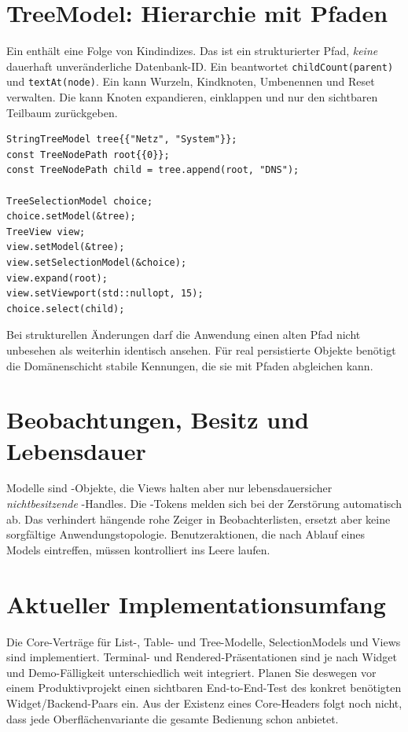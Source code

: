 \section{TreeModel: Hierarchie mit Pfaden}
Ein  enthält eine Folge
von Kindindizes. Das ist ein strukturierter
Pfad, \emph{keine} dauerhaft unveränderliche
Datenbank-ID. Ein  beantwortet
\texttt{childCount(parent)} und
\texttt{textAt(node)}. Ein
 kann Wurzeln,
Kindknoten, Umbenennen und Reset verwalten.
Die  kann Knoten
expandieren, einklappen und nur den
sichtbaren Teilbaum zurückgeben.

\begin{lstlisting}[language=SASDCpp]
StringTreeModel tree{{"Netz", "System"}};
const TreeNodePath root{{0}};
const TreeNodePath child = tree.append(root, "DNS");

TreeSelectionModel choice;
choice.setModel(&tree);
TreeView view;
view.setModel(&tree);
view.setSelectionModel(&choice);
view.expand(root);
view.setViewport(std::nullopt, 15);
choice.select(child);
\end{lstlisting}
Bei strukturellen Änderungen darf die
Anwendung einen alten Pfad nicht
unbesehen als weiterhin identisch ansehen.
Für real persistierte Objekte benötigt
die Domänenschicht stabile Kennungen,
die sie mit Pfaden abgleichen kann.

\section{Beobachtungen, Besitz und Lebensdauer}
Modelle sind -Objekte,
die Views halten aber nur lebensdauersicher
\emph{nichtbesitzende} -Handles.
Die -Tokens melden sich
bei der Zerstörung automatisch ab.
Das verhindert hängende rohe Zeiger
in Beobachterlisten, ersetzt aber
keine sorgfältige Anwendungstopologie.
Benutzeraktionen, die nach Ablauf eines
Models eintreffen, müssen kontrolliert
ins Leere laufen.

\section{Aktueller Implementationsumfang}
Die Core-Verträge für List-, Table- und
Tree-Modelle, SelectionModels und Views
sind implementiert. Terminal- und
Rendered-Präsentationen sind je nach
Widget und Demo-Fälligkeit unterschiedlich
weit integriert. Planen Sie deswegen vor
einem Produktivprojekt einen sichtbaren
End-to-End-Test des konkret benötigten
Widget/Backend-Paars ein. Aus der Existenz
eines Core-Headers folgt noch nicht,
dass jede Oberflächenvariante die gesamte
Bedienung schon anbietet.

